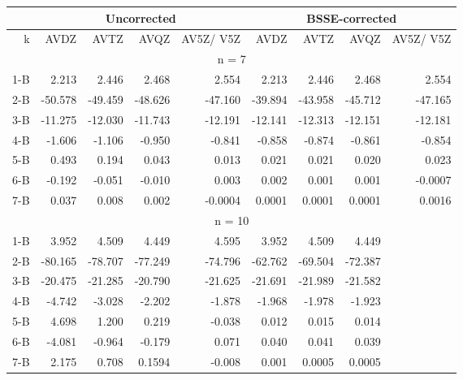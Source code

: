 \begin{table}[t]
\begin{adjustbox}{width=\columnwidth,center}
\begin{tabular}{@{}rrrrrrrrr@{}}
\toprule
     & \multicolumn{4}{c}{Uncorrected}         & \multicolumn{4}{c}{BSSE-corrected}      \\ \midrule
k    & AVDZ    & AVTZ    & AVQZ    & AV5Z/ V5Z & AVDZ    & AVTZ    & AVQZ    & AV5Z/ V5Z \\
\hline
\multicolumn{9}{c}{n = 7}                                                                \\
\hline
1-B  & 2.213   & 2.446   & 2.468   & 2.554     & 2.213   & 2.446   & 2.468   & 2.554     \\
2-B  & -50.578 & -49.459 & -48.626 & -47.160   & -39.894 & -43.958 & -45.712 & -47.165   \\
3-B  & -11.275 & -12.030 & -11.743 & -12.191   & -12.141 & -12.313 & -12.151 & -12.181   \\
4-B  & -1.606  & -1.106  & -0.950  & -0.841    & -0.858  & -0.874  & -0.861  & -0.854    \\
5-B  & 0.493   & 0.194   & 0.043   & 0.013     & 0.021   & 0.021   & 0.020   & 0.023     \\
6-B  & -0.192  & -0.051  & -0.010  & 0.003     & 0.002   & 0.001   & 0.001   & -0.0007   \\
7-B  & 0.037   & 0.008   & 0.002   & -0.0004   & 0.0001  & 0.0001  & 0.0001  & 0.0016    \\
\hline
\multicolumn{9}{c}{n = 10}                                                               \\
\hline
1-B  & 3.952   & 4.509   & 4.449   & 4.595     & 3.952   & 4.509   & 4.449   &           \\
2-B  & -80.165 & -78.707 & -77.249 & -74.796   & -62.762 & -69.504 & -72.387 &           \\
3-B  & -20.475 & -21.285 & -20.790 & -21.625   & -21.691 & -21.989 & -21.582 &           \\
4-B  & -4.742  & -3.028  & -2.202  & -1.878    & -1.968  & -1.978  & -1.923  &           \\
5-B  & 4.698   & 1.200   & 0.219   & -0.038    & 0.012   & 0.015   & 0.014   &           \\
6-B  & -4.081  & -0.964  & -0.179  & 0.071     & 0.040   & 0.041   & 0.039   &           \\
7-B  & 2.175   & 0.708   & 0.1594  & -0.008    & 0.001   & 0.0005  & 0.0005  &           \\

\end{tabular}
\end{adjustbox}
\end{table}
